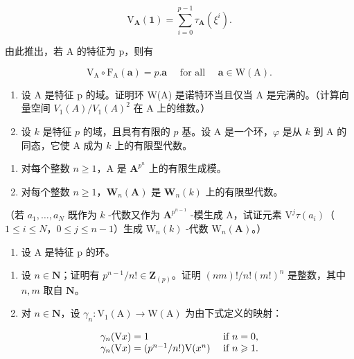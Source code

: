 \[
\mathrm{V} _ {\mathbf {A}} (\mathbf {1}) = \sum_ {i = 0} ^ {p - 1} \tau_ {\mathbf {A}} (\xi^ {i}).
\]

由此推出，若 A 的特征为 p，则有

\[
\mathrm{V} _ {\mathrm{A}} \circ \mathrm{F} _ {\mathrm{A}} (\boldsymbol {a}) = p. \boldsymbol {a} \quad \text { for all } \quad \boldsymbol {a} \in \mathrm{W} (\mathrm{A}).
\]

\begin{enumerate}
\def\labelenumi{\arabic{enumi})}
\setcounter{enumi}{8}
\item
  设 A 是特征 p 的域。证明环 W(A) 是诺特环当且仅当 A 是完满的。（计算向量空间 \(V_{1}(A)/V_{1}(A)^{2}\) 在 A 上的维数。）
\item
  设 \(k\) 是特征 \(p\) 的域，且具有有限的 \(p\) 基。设 A 是一个环，\(\varphi\) 是从 \(k\) 到 A 的同态，它使 A 成为 \(k\) 上的有限型代数。
\end{enumerate}

\begin{enumerate}
\def\labelenumi{\alph{enumi})}
\item
  对每个整数 \(n \geqslant 1\)，A 是 \(\mathbf{A}^{p^n}\) 上的有限生成模。
\item
  对每个整数 \(n \geqslant 1\)，\(\mathbf{W}_n(\mathbf{A})\) 是 \(\mathbf{W}_n(k)\) 上的有限型代数。
\end{enumerate}

（若 \(a_{1},\ldots,a_{N}\) 既作为 \(k\) -代数又作为 \(\mathbf{A}^{p^{n-1}}\) -模生成 A，试证元素 \(\mathrm{V}^j\tau(a_i)\)（\(1\leqslant i\leqslant N\)，\(0\leqslant j\leqslant n-1\)）生成 \(\mathrm{W}_{n}(k)\) -代数 \(\mathrm{W}_{n}(\mathbf{A})\)。）

\begin{enumerate}
\def\labelenumi{\arabic{enumi})}
\setcounter{enumi}{10}
\tightlist
\item
  设 A 是特征 p 的环。
\end{enumerate}

\begin{enumerate}
\def\labelenumi{\alph{enumi})}
\item
  设 \(n \in \mathbf{N}\)；证明有 \(p^{n-1}/n! \in \mathbf{Z}_{(p)}\)。证明 \((nm)!/n!(m!)^n\) 是整数，其中 \(n, m\) 取自 \(\mathbf{N}\)。
\item
  对 \(n \in \mathbf{N}\)，设 \(\gamma_{n}: \mathrm{V}_{1}(\mathrm{A}) \to \mathrm{W}(\mathrm{A})\) 为由下式定义的映射：
\end{enumerate}

\[
\begin{array}{l l} \gamma_ {n} (\mathrm{V} x) = 1 & \text { if } n = 0, \\ \gamma_ {n} (\mathrm{V} x) = (p ^ {n - 1} / n!) \mathrm{V} (x ^ {n}) & \text { if } n \geqslant 1. \end{array}
\]

